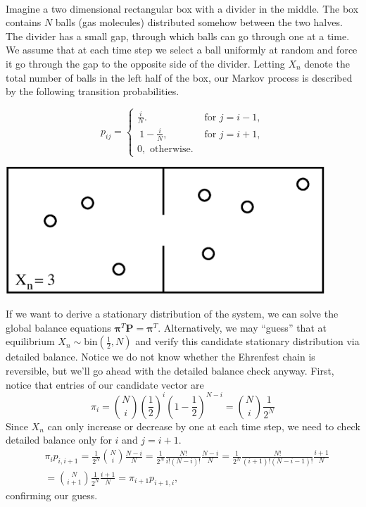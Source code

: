 \documentclass[11pt]{article}\usepackage[]{graphicx}\usepackage[]{color}
\numberwithin{algorithm}{section}
\theoremstyle{remark}
\theoremstyle{definition}
\newenvironment{example}[1]{\begin{trivlist}
\item[\hskip \labelsep {\bfseries Example}: \underline{#1}]\ \\}{\end{trivlist}}
\begin{document}
\begin{example}{Ehrenfest model of diffusion}
Imagine a two dimensional rectangular box with a divider in the middle. The box contains $N$ balls
(gas molecules)  distributed somehow between the two halves. The divider has a small gap, through which 
balls can go through one at a time. We assume that at each time step we select a ball uniformly at 
random and force it go through the gap to the opposite side of the divider. Letting $X_n$ denote
the total number of balls in the left half of the box, our Markov process is described by the 
following transition probabilities.

\begin{minipage}[c]{0.5\textwidth}
  \[
  p_{ij} =
  \begin{cases}
    \frac{i}{N}. &\text{ for } j=i-1,\\\
    1-\frac{i}{N}, &\text{ for } j=i+1,\\
    0, \text{ otherwise}.
  \end{cases}
  \]
\end{minipage}
\begin{minipage}[r]{0.45\textwidth}
  \vspace{0.2cm}
  \includegraphics[width=0.9\textwidth]{ehrenfest}
  \vspace{0.3cm}
\end{minipage}

If we want to derive a stationary distribution of the system, we can solve the global balance equations
$\boldsymbol{\pi}^T \mathbf{P} = \boldsymbol{\pi}^{T}$. Alternatively, we may ``guess'' that at
equilibrium $X_n \sim \text{bin}(\frac{1}{2}, N)$ and verify this candidate stationary distribution
via detailed balance. Notice we do not know whether the Ehrenfest chain is reversible, but we'll go
ahead with the detailed balance check anyway. First, notice that entries of our candidate vector are
\begin{equation*}
  \pi_i = {N \choose i} \left(\frac{1}{2}\right)^i\left(1-\frac{1}{2}\right)^{N-i} = 
  {N \choose i} \frac{1}{2^N}
\end{equation*}
Since $X_n$ can only increase or decrease by one at each time step, we need to check detailed balance 
only for $i$ and $j = i + 1$.  
\[
\begin{split}
  &\pi_i p_{i,i+1} = \frac{1}{2^N}{N \choose i} \frac{N - i}{N} =
  \frac{1}{2^N} \frac{N!}{i!(N-i)!} \frac{N - i}{N} =
  \frac{1}{2^N} \frac{N!}{(i+1)!(N-i-1)!} \frac{i+1}{N}\\
  &= {N \choose i+1} \frac{1}{2^N} \frac{i+1}{N} = \pi_{i+1} p_{i+1,i},
\end{split}
\]
confirming our guess.
\end{example}
\end{document}
